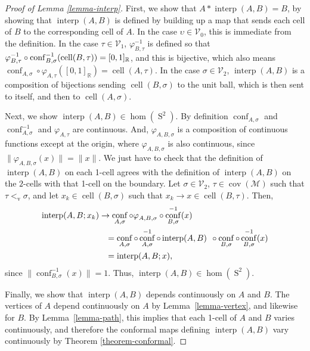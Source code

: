 \documentclass[JEP,XML,SOM,Unicode,NoFloatCountersInSection,published]{cedram}
\theoremstyle{remark}
\let\mc\mathcal
\let\mb\mathbb
\let\phi\varphi
\newcommand{\vv}{{\vvv}}
\DeclareMathOperator{\vvv}{v}
\DeclareMathOperator{\sphere}{S}
\DeclareMathOperator{\cell}{cell}
\DeclareMathOperator{\conf}{conf}
\DeclareMathOperator{\interp}{interp}
\DeclareMathOperator{\cov}{cov}
\begin{document}
\begin{proof}[Proof of Lemma \ref{lemma-interp}]
First, we show that $A* \interp(A,B) = B$, by showing that $\interp(A,B)$ is defined by building up a map that sends each cell of $B$ to the corresponding cell of $A$.
In the case $\upsilon \in \mc{V}_0$, this is immediate from the definition.
In the case $\tau \in \mc{V}_1$, $\phi_{B,\tau}^{-1}$ is defined so that $\hbox{$\phi_{B,\tau}^{-1} \circ \conf_{B,\sigma}^{-1}(\cell(B,\tau))$} = [0,1]_\mb{R}$, and this is bijective, which also means $\conf_{A,\sigma}^{\phantom1} \circ \phi_{A,\tau}^{\phantom1}([0,1]_\mb{R}) = \cell(A,\tau)$.
In the case $\sigma \in \mc{V}_2$, $\interp(A,B)$ is a composition of bijections sending $\cell(B,\sigma)$ to the unit ball, which is then sent to itself, and then to $\cell(A,\sigma)$.

Next, we show $\interp(A,B) \in \hom(\sphere^2)$.
By definition $\conf_{A,\sigma}$ and $\conf_{A,\sigma}^{-1}$ and $\phi_{A,\tau}$ are continuous.
And, $\phi_{A,B,\sigma}$ is a composition of continuous functions except at the origin, where $\phi_{A,B,\sigma}$ is also continuous, since $\|\phi_{A,B,\sigma}(x)\| = \|x\|$.
We just have to check that the definition of $\interp(A,B)$ on each 1-cell agrees with the definition of $\interp(A,B)$ on the $2$-cells with that 1-cell on the boundary.
Let $\sigma \in \mc{V}_2$, $\tau \in \cov(\mc{M})$ such that $\tau <_\vv \sigma$, and let $x_k \in \cell(B,\sigma)$ such that $x_k \to x \in \cell(B,\tau)$. Then,
\begin{align*}
\interp(A,B;x_k)
& \to \conf_{A,\sigma}^{\phantom1} \circ \phi_{A,B,\sigma}^{\phantom1} \circ \conf_{B,\sigma}^{-1}(x) \\
&\hspace*{2.8mm} = \conf_{A,\sigma}^{\phantom1} \circ \conf_{A,\sigma}^{-1} \circ \interp(A,B)^{\phantom1} \circ \conf_{B,\sigma}^{\phantom1} \circ \conf_{B,\sigma}^{-1}(x) \\
&\hspace*{2.8mm} = \interp(A,B;x),
\end{align*}
since $\| \conf_{B,\sigma}^{-1}(x) \| = 1$. Thus, $\interp(A,B) \in \hom(\sphere^2)$.

Finally, we show that $\interp(A,B)$ depends continuously on $A$ and $B$.
The vertices of $A$ depend continuously on $A$ by Lemma~\ref{lemma-vertex}, and likewise for $B$.
By Lemma~\ref{lemma-path}, this implies that each 1-cell of $A$ and $B$ varies continuously, and therefore the conformal maps defining $\interp(A,B)$ vary continuously by Theorem \ref{theorem-conformal}.
\end{proof}
\end{document}
